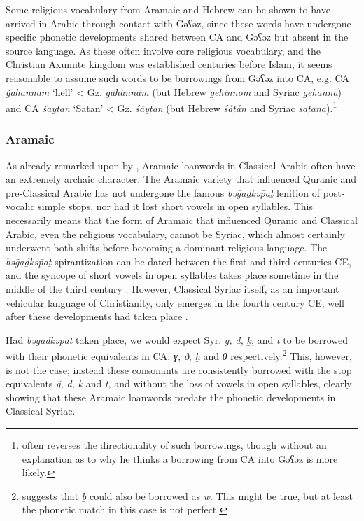 \documentclass[output=paper]{langsci/langscibook}
\begin{document}
Some religious vocabulary from Aramaic and Hebrew can be shown to have arrived in Arabic through contact with Gəʕəz, since these words have undergone specific phonetic developments shared between CA and Gəʕəz but absent in the source language. As these often involve core religious vocabulary, and the Christian Axumite kingdom was established centuries before Islam, it seems reasonable to assume such words to be borrowings from Gəʕəz into CA, e.g. CA \textit{ǧahannam} ‘hell’ < Gz. \textit{gähännäm} (but Hebrew \textit{gehinnom} and Syriac \textit{gehannā}) and CA \textit{šayṭān} ‘Satan’ < Gz. \textit{śäyṭan} (but Hebrew \textit{śåṭån} and Syriac \textit{sāṭānā}).\footnote{\citet{Leslau1990} often reverses the directionality of such borrowings, though without an explanation as to why he thinks a borrowing from CA into Gəʕəz is more likely.}

\subsubsection{\label{bkm:Ref13224460}Aramaic}

As already remarked upon by \citet{Retsö2011}, Aramaic loanwords in Classical Arabic often have an extremely archaic character. The Aramaic variety that influenced Quranic and pre-Classical Arabic has not undergone the famous \textit{bəḡaḏkəp̄aṯ} lenition of post-vocalic simple stops, nor had it lost short vowels in open syllables. This necessarily means that the form of Aramaic that influenced Quranic and Classical Arabic, even the religious vocabulary, cannot be Syriac, which almost certainly underwent both shifts before becoming a dominant religious language. The \textit{bəḡaḏkəp̄aṯ} spirantization can be dated between the first and third centuries CE, and the syncope of short vowels in open syllables takes place sometime in the middle of the third century \citep[41--42]{Gzella2015}. However, Classical Syriac itself, as an important vehicular language of Christianity, only emerges in the fourth century CE, well after these developments had taken place \citep[259]{Gzella2015}.

Had \textit{bəḡaḏkəp̄aṯ} taken place, we would expect Syr. \textit{ḡ,} \textit{ḏ,} \textit{ḵ,} and \textit{ṯ} to be borrowed with their phonetic equivalents in CA: \textit{ɣ}, \textit{ð}, \textit{ḫ} and \textit{θ} respectively.\footnote{\cite{Retsö2011} suggests that \textit{ḇ} could also be borrowed as \textit{w}. This might be true, but at least the phonetic match in this case is not perfect.} This, however, is not the case; instead these consonants are consistently borrowed with the stop equivalents \textit{ǧ,} \textit{d,} \textit{k} and \textit{t}, and without the loss of vowels in open syllables, clearly showing that these Aramaic loanwords predate the phonetic developments in Classical Syriac.
\end{document}
